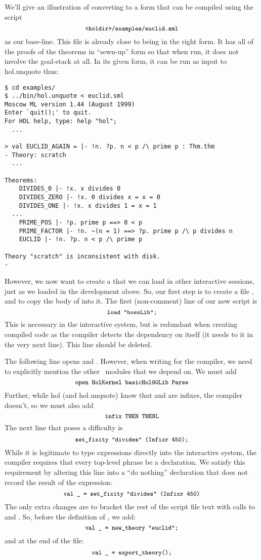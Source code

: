 We'll give an illustration of converting to a form that can be
compiled using the script
\[
  \mbox{\ml{<holdir>/examples/euclid.sml}}
\] as our base-line.  This
file is already close to being in the right form.  It has all of the
proofs of the theorems in ``sewn-up'' form so that when run, it does
not involve the goal-stack at all.  In its given form, it can be run
as input to \textsf{hol.unquote} thus:

\setcounter{sessioncount}{1}
\begin{session}
\begin{verbatim}
$ cd examples/
$ ../bin/hol.unquote < euclid.sml
Moscow ML version 1.44 (August 1999)
Enter `quit();' to quit.
For HOL help, type: help "hol";
  ...

> val EUCLID_AGAIN = |- !n. ?p. n < p /\ prime p : Thm.thm
- Theory: scratch
  ...

Theorems:
    DIVIDES_0 |- !x. x divides 0
    DIVIDES_ZERO |- !x. 0 divides x = x = 0
    DIVIDES_ONE |- !x. x divides 1 = x = 1
  ...
    PRIME_POS |- !p. prime p ==> 0 < p
    PRIME_FACTOR |- !n. ~(n = 1) ==> ?p. prime p /\ p divides n
    EUCLID |- !n. ?p. n < p /\ prime p

Theory "scratch" is inconsistent with disk.
-
\end{verbatim}
\end{session}

However, we now want to create a  that we can load in
other interactive sessions, just as we loaded  in
the development above.  So, our first step is to create a file
, and to copy the body of  into
it.  The first (non-comment) line of our new script is
\[
    \mbox{\ml{load "bossLib";}}
\]
This is necessary in the interactive system, but is redundant when
creating compiled code as the compiler detects the dependency on
 itself (it needs to  it in the very next line).
This line should be deleted.

The following line opens  and .
However, when writing for the compiler, we need to explicitly mention
the other \HOL\ modules that we depend on.  We must add
\[
\mbox{\ml{open HolKernel basicHol90Lib Parse}}
\]
Further, while \textsf{hol} (and \textsf{hol.unquote}) know that
 and  are infixes, the compiler doesn't, so we must
also add
\[
\mbox{\ml{infix THEN THENL}}
\]
The next line that poses a difficulty is
\[
  \mbox{\ml{set\_fixity "divides" (Infixr 450);}}
\]
While it is legitimate to type expressions directly into the
interactive system, the compiler requires that every top-level phrase
be a declaration.  We satisfy this requirement by altering this line
into a ``do nothing'' declaration that does not record the result of
the expression:
\[
\mbox{\ml{val \_{} = set\_fixity "divides" (Infixr 450)}}
\]
The only extra changes are to bracket the rest of the script file text
with calls to  and .  So,
before the definition of , we add:
\[
\mbox{\ml{val \_{} = new\_theory "euclid";}}
\]
and at the end of the file:
\[
\mbox{\ml{val \_{} = export\_theory();}}
\]

